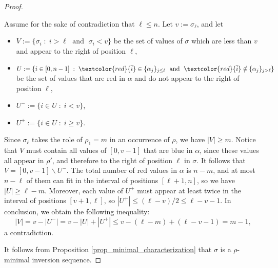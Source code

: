 \documentclass[a4paper,11pt]{article}
\theoremstyle{definition}
\theoremstyle{remark}
\newcommand{\tc}{\textcolor}
\renewcommand{\r}[1]{\tc{red}{\overline{#1}}}
\begin{document}
\begin{proof}
\begin{itemize}
        Assume for the sake of contradiction that $\ell \leq n$. Let $v := \sigma_{\ell}$, and let
        \begin{itemize}
            \item $V := \{\sigma_i \; : \; i > \ell \; \text{ and } \; \sigma_i < v \}$ be the set of values of $\sigma$ which are less than $v$ and appear to the right of position $\ell$,
            \item $U := \{i \in [0,n-1] \; : \; \r i \in \{\alpha_j\}_{j \leq \ell} \; \text{ and } \; \r i \notin \{\alpha_j\}_{j > \ell}\}$ be the set of values that are red in $\alpha$ and do not appear to the right of position $\ell$,
            \item $U^- :=\{i \in U \; : \; i < v\}$, 
            \item $U^+ := \{i \in U \; : \; i \geq v\}$.
        \end{itemize}
        Since $\sigma_\ell$ takes the role of $\rho_1 = m$ in an occurrence of $\rho$, we have $|V| \geq m$. Notice that $V$ must contain all values of $[0,v-1]$ that are blue in $\alpha$, since these values all appear in $\rho'$, and therefore to the right of position $\ell$ in $\sigma$. It follows that $V = [0,v-1] \backslash U^-$. 
        The total number of red values in $\alpha$ is $n-m$, and at most $n-\ell$ of them can fit in the interval of positions $[\ell+1,n]$, so we have $|U| \geq \ell - m$. Moreover, each value of $U^+$ must appear at least twice in the interval of positions $[v+1,\ell]$, so $|U^+| \leq (\ell - v)/2 \leq \ell - v - 1$. In conclusion, we obtain the following inequality:
        $$|V| = v - |U^-| = v - |U| + |U^+| \leq v - (\ell - m) + (\ell - v - 1) = m -1,$$
        a contradiction.
    \end{itemize}
    It follows from Proposition \ref{prop_minimal_characterization} that $\sigma$ is a $\rho$-minimal inversion sequence.
\end{proof} 
\end{document}
